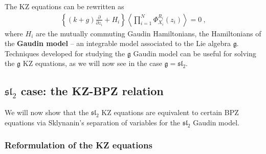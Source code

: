 \documentclass[12pt, a4paper, notitlepage, twoside]{report}
\numberwithin{equation}{section}
\theoremstyle{break}
\begin{document}
The KZ equations can be rewritten as 
\begin{align}
 \left\{(k+g){\frac{\partial}{\partial z_i}} + H_i \right\}\left\langle \prod_{i=1}^N \Phi^{R_i}_{X_i}(z_i)\right\rangle   = 0 \ ,
\label{phz}
\end{align}
where $H_i$ are the mutually commuting Gaudin Hamiltonians, the Hamiltonians of the \textbf{\boldmath Gaudin model} -- an integrable model associated to the Lie algebra $\mathfrak{g}$.
Techniques developed for studying the $\mathfrak{g}$ Gaudin model can be useful for solving the $\mathfrak{g}$ KZ equations, as we will now see in the case $\mathfrak{g} = \mathfrak{sl}_2$. 


\subsection{\texorpdfstring{$\mathfrak{sl}_2$}{sl2} case: the KZ-BPZ relation} 

We will now show that the $\mathfrak{sl}_2$ KZ equations are equivalent to certain BPZ equations via Sklynanin's separation of variables for the $\mathfrak{sl}_2$ Gaudin model. 

\subsubsection{Reformulation of the KZ equations}
\end{document}
